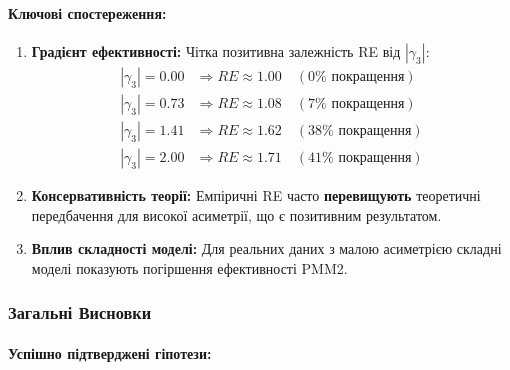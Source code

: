 \documentclass[12pt,a4paper]{article}
\begin{document}
\paragraph{Ключові спостереження:}

\begin{enumerate}
    \item \textbf{Градієнт ефективності:} Чітка позитивна залежність RE від $|\gamma_3|$:
    \begin{align*}
    |\gamma_3| = 0.00 &\Rightarrow RE \approx 1.00 \quad (0\% \text{ покращення}) \\
    |\gamma_3| = 0.73 &\Rightarrow RE \approx 1.08 \quad (7\% \text{ покращення}) \\
    |\gamma_3| = 1.41 &\Rightarrow RE \approx 1.62 \quad (38\% \text{ покращення}) \\
    |\gamma_3| = 2.00 &\Rightarrow RE \approx 1.71 \quad (41\% \text{ покращення})
    \end{align*}

    \item \textbf{Консервативність теорії:} Емпіричні RE часто \textbf{перевищують} теоретичні передбачення для високої асиметрії, що є позитивним результатом.

    \item \textbf{Вплив складності моделі:} Для реальних даних з малою асиметрією складні моделі показують погіршення ефективності PMM2.
\end{enumerate}

\subsubsection{Загальні Висновки}
\label{subsubsec:overall_conclusions}

\paragraph{Успішно підтверджені гіпотези:}
\end{document}
